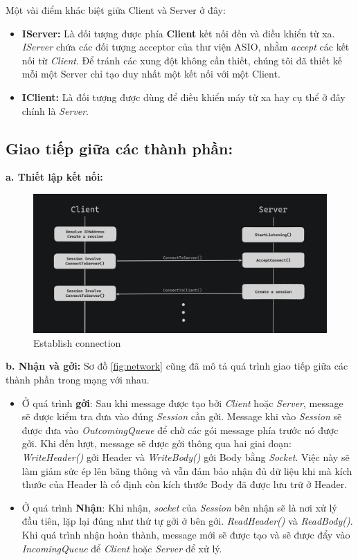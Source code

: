Một vài điểm khác biệt giữa Client và Server ở đây: 
\begin{itemize}
	\item \textbf{IServer: } Là đối tượng được phía \textbf{Client} kết nối đến và điều khiển từ xa. \textit{IServer} chứa các đối tượng acceptor của thư viện ASIO, nhằm \textit{accept} các kết nối từ \textit{Client}. Để tránh các xung đột không cần thiết, chúng tôi đã thiết kế mỗi một Server chỉ tạo duy nhất một kết nối với một Client.
	\item \textbf{IClient: } Là đối tượng được dùng để điều khiển máy từ xa hay cụ thể ở đây chính là \textit{Server}. 
\end{itemize}

\subsection{Giao tiếp giữa các thành phần: }

\textbf{a. Thiết lập kết nối:}
\begin{figure}[H]
	\centering
	\includegraphics[width=\linewidth]{latex/architechture/connecting}
	\caption{Establish connection}
	\label{fig:handshake}
\end{figure}

\textbf{b. Nhận và gởi: }
Sơ đồ \ref{fig:network} cũng đã mô tả quá trình giao tiếp giữa các thành phần trong mạng với nhau. 
\begin{itemize}
	\item Ở quá trình \textbf{gởi}: Sau khi message được tạo bởi \textit{Client} hoặc \textit{Server}, message sẽ được kiểm tra đưa vào đúng \textit{Session} cần gởi. Message khi vào \textit{Session} sẽ được đưa vào \textit{OutcomingQueue} để chờ các gói message phía trước nó được gởi. Khi đến lượt, message sẽ được gởi thông qua hai giai đoạn: \textit{WriteHeader()} gởi Header và \textit{WriteBody()} gởi Body bằng \textit{Socket}. Việc này sẽ làm giảm sức ép lên băng thông và vẫn đảm bảo nhận đủ dữ liệu khi mà kích thước của Header là cố định còn kích thước Body đã được lưu trữ ở Header.
	\item Ở quá trình \textbf{Nhận}: Khi nhận, \textit{socket} của \textit{Session} bên nhận sẽ là nơi xử lý đầu tiên, lặp lại đúng như thứ tự gởi ở bên gởi. \textit{ReadHeader()} và \textit{ReadBody()}. Khi quá trình nhận hoàn thành, message mới sẽ được tạo và sẽ được đẩy vào \textit{IncomingQueue} để \textit{Client} hoặc \textit{Server} để xử lý.
\end{itemize}

